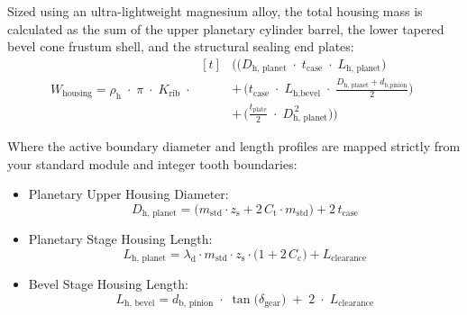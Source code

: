         Sized using an ultra-lightweight magnesium alloy, the total housing mass is calculated as 
        the sum of the upper planetary cylinder barrel, the lower tapered bevel cone frustum shell, and 
        the structural sealing end plates:
            \begin{equation}
                \label{eq:housingmass}
                W_{\text{housing}}
                = \rho_{\text{h}}\;\cdot\;\pi\;\cdot\;K_{\text{rib}}\;\cdot\;
                \!\!
                \begin{aligned}[t]
                    &\bigl(\bigl(D_{\text{h, planet}}\;\cdot\;t_{\text{case}}\;\cdot\;L_{\text{h, planet}}\bigr)
                    \\[4pt]
                    &+\,\bigl(t_{\text{case}}\;\cdot\;L_{\text{h,bevel}}
                    \;\cdot\;\frac{D_{\text{h, planet}}+d_{\text{b,pinion}}}{2}\bigr)
                    \\[4pt]
                    &+\,\bigl(\tfrac{t_{\text{plate}}}{2}\;\cdot\;D_{\text{h, planet}}^{\,2}\bigr)\bigr)
                \end{aligned}
            \end{equation}

        Where the active boundary diameter and length profiles are mapped strictly from your standard 
        module and integer tooth boundaries:
			\begin{itemize}
				\item Planetary Upper Housing Diameter:
                    \begin{equation}
                        \label{eq:planetaryupperhousingdia}
                        D_{\text{h, planet}}
                        = \bigl( m_{\text{std}}\!\cdot\! z_{\text{s}}
                        + 2\,C_{\text{t}}\!\cdot\! m_{\text{std}} \bigr)
                        + 2\,t_{\text{case}}
                    \end{equation}

				\item Planetary Stage Housing Length:
                    \begin{equation}
                        \label{eq:planetarystagehousinglength}
                        L_{\text{h, planet}}
                        = \lambda_{\text{d}}\cdot m_{\text{std}}\cdot z_{\text{s}}\cdot
                        \bigl(1+2\,C_{\text{c}}\bigr) + L_{\text{clearance}}
                    \end{equation}

				\item Bevel Stage Housing Length:
                    \begin{equation}
                        \label{eq:bevelstagehousinglength}
                        L_{\text{h, bevel}}
                        = d_{\text{b, pinion}} \;\cdot\; \tan\!\bigl(\delta_{\text{gear}}\bigr)
                        \;+\; 2 \;\cdot\; L_{\text{clearance}}
                    \end{equation}
			\end{itemize}
        

